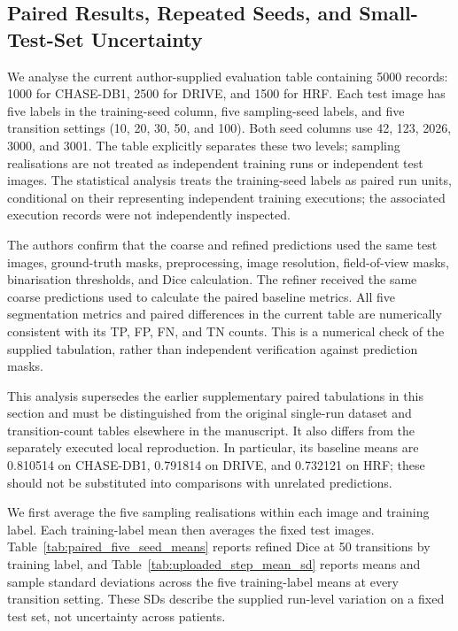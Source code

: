 \documentclass[jimaging,article,submit,pdftex,moreauthors]{Definitions/mdpi}%
\begin{document}
\subsection{Paired Results, Repeated Seeds, and Small-Test-Set Uncertainty}

\label{sec:per_image_uncertainty}



We analyse the current author-supplied evaluation table containing 5000 records: 1000 for CHASE-DB1, 2500 for DRIVE, and 1500 for HRF. Each test image has five labels in the training-seed column, five sampling-seed labels, and five transition settings (10, 20, 30, 50, and 100). Both seed columns use 42, 123, 2026, 3000, and 3001. The table explicitly separates these two levels; sampling realisations are not treated as independent training runs or independent test images. The statistical analysis treats the training-seed labels as paired run units, conditional on their representing independent training executions; the associated execution records were not independently inspected.



The authors confirm that the coarse and refined predictions used the same test images, ground-truth masks, preprocessing, image resolution, field-of-view masks, binarisation thresholds, and Dice calculation. The refiner received the same coarse predictions used to calculate the paired baseline metrics. All five segmentation metrics and paired differences in the current table are numerically consistent with its TP, FP, FN, and TN counts. This is a numerical check of the supplied tabulation, rather than independent verification against prediction masks.



This analysis supersedes the earlier supplementary paired tabulations in this section and must be distinguished from the original single-run dataset and transition-count tables elsewhere in the manuscript. It also differs from the separately executed local reproduction. In particular, its baseline means are 0.810514 on CHASE-DB1, 0.791814 on DRIVE, and 0.732121 on HRF; these should not be substituted into comparisons with unrelated predictions.



We first average the five sampling realisations within each image and training label. Each training-label mean then averages the fixed test images. Table~\ref{tab:paired_five_seed_means} reports refined Dice at 50 transitions by training label, and Table~\ref{tab:uploaded_step_mean_sd} reports means and sample standard deviations across the five training-label means at every transition setting. These SDs describe the supplied run-level variation on a fixed test set, not uncertainty across patients.
\end{document}
